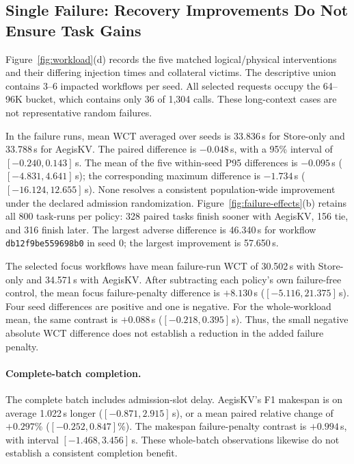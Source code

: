 \subsection{Single Failure: Recovery Improvements Do Not Ensure Task Gains}
\label{sec:primary-results}


Figure~\ref{fig:workload}(d) records the five matched logical/physical
interventions and their differing injection times and collateral victims.
The descriptive union contains 3--6 impacted workflows per seed. All selected
requests occupy the 64--96K bucket, which contains only 36 of 1,304 calls.
These long-context cases are not representative random failures.

In the failure runs, mean WCT averaged over seeds is 33.836\,s for
Store-only and 33.788\,s for AegisKV. The paired difference is
$-0.048$\,s, with a 95\% interval of $[-0.240,0.143]$\,s.
The mean of the five within-seed P95 differences is $-0.095$\,s
($[-4.831,4.641]$\,s); the corresponding maximum difference is
$-1.734$\,s ($[-16.124,12.655]$\,s). None resolves a consistent
population-wide improvement under the declared admission randomization.
Figure~\ref{fig:failure-effects}(b) retains all 800 task-runs per policy:
328 paired tasks finish sooner with AegisKV, 156 tie, and 316 finish later.
The largest adverse difference is 46.340\,s for workflow
\texttt{db12f9be559698b0} in seed 0; the largest improvement is 57.650\,s.

The selected focus workflows have mean failure-run WCT of 30.502\,s
with Store-only and 34.571\,s with AegisKV. After subtracting each
policy's own failure-free control, the mean focus failure-penalty
difference is $+8.130$\,s ($[-5.116,21.375]$\,s).
Four seed differences are positive and one is negative.
For the whole-workload mean, the same contrast is $+0.088$\,s
($[-0.218,0.395]$\,s). Thus, the small negative absolute WCT difference
does not establish a reduction in the added failure penalty.

\paragraph{Complete-batch completion.}
The complete batch includes admission-slot delay. AegisKV's F1 makespan is
on average 1.022\,s longer ($[-0.871,2.915]$\,s), or a mean paired
relative change of $+0.297$\% ($[-0.252,0.847]$\%).
The makespan failure-penalty contrast is $+0.994$\,s, with interval
$[-1.468,3.456]$\,s. These whole-batch observations likewise do not
establish a consistent completion benefit.

